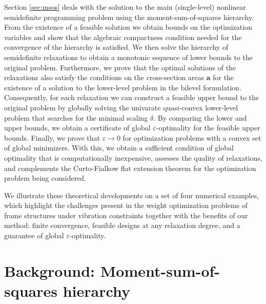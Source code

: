 \documentclass[final,onefignum,onetabnum]{siamart220329}
\begin{document}
Section \ref{sec:msos} deals with the solution to the main (single-level) nonlinear semidefinite programming problem using the moment-sum-of-squares hierarchy. From the existence of a feasible solution we obtain bounds on the optimization variables and show that the algebraic compactness condition needed for the convergence of the hierarchy is satisfied. We then solve the hierarchy of semidefinite relaxations to obtain a monotonic sequence of lower bounds to the original problem. Furthermore, we prove that the optimal solutions of the relaxations also satisfy the conditions on the cross-section areas $\mathbf{a}$ for the existence of a solution to the lower-level problem in the bilevel formulation. Consequently, for each relaxation we can construct a feasible upper bound to the original problem by globally solving the univarate quasi-convex lower-level problem that searches for the minimal scaling $\delta$. By comparing the lower and upper bounds, we obtain a certificate of global $\varepsilon$-optimality for the feasible upper bounds. Finally, we prove that $\varepsilon\rightarrow0$ for optimization problems with a convex set of global minimizers. With this, we obtain a sufficient condition of global optimality that is computationally inexpensive, assesses the quality of relaxations, and complements the Curto-Fialkow flat extension theorem \cite{Curto1996} for the optimization problem being considered.

We illustrate these theoretical developments on a set of {four} numerical examples, which highlight the challenges present in the weight optimization problems of frame structures under vibration constraints together with the benefits of our method: finite convergence, feasible designs at any relaxation degree, and a guarantee of global $\varepsilon$-optimality.


\newpage\section{Background: Moment-sum-of-squares hierarchy}\label{sec:background}
\end{document}
